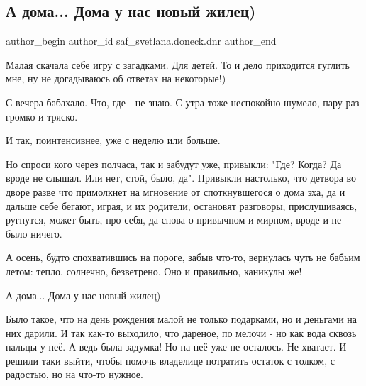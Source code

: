  
 
 
 
 
 
\subsection{А дома... Дома у нас новый жилец)}
\label{sec:30_10_2018.fb.saf_svetlana.doneck.dnr.1.doma_u_nas_novyj_zhilec}
 
\ifcmt
 author_begin
   author_id saf_svetlana.doneck.dnr
 author_end
\fi

Малая скачала себе игру с загадками. Для детей. То и дело приходится гуглить
мне, ну не догадываюсь об ответах на некоторые!)

С вечера бабахало. Что, где - не знаю. С утра тоже неспокойно шумело, пару раз
громко и тряско. 

И так, поинтенсивнее, уже с неделю или больше. 

Но спроси кого через полчаса, так и забудут уже, привыкли: "Где? Когда? Да
вроде не слышал. Или нет, стой, было, да". Привыкли настолько, что детвора во
дворе разве что примолкнет на мгновение от споткнувшегося о дома эха, да и
дальше себе бегают, играя, и их родители, остановят разговоры, прислушиваясь,
ругнутся, может быть, про себя, да снова о привычном и мирном, вроде и не было
ничего.


А осень, будто спохватившись на пороге, забыв что-то, вернулась чуть не бабьим
летом: тепло, солнечно, безветрено. Оно и правильно, каникулы же!

А дома... Дома у нас новый жилец) 

Было такое, что на день рождения малой не только подарками, но и деньгами на
них дарили. И так как-то выходило, что дареное, по мелочи - но как вода сквозь
пальцы у неё. А ведь была задумка! Но на неё уже не осталось. Не хватает. И
решили таки выйти, чтобы помочь владелице потратить остаток с толком, с
радостью, но на что-то нужное.

